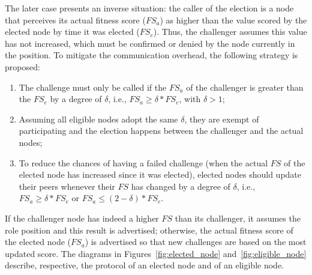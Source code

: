 The later case presents an inverse situation: the caller of the election is a node that perceives its actual fitness score ($FS_a$) as higher than the value scored by the elected node by time it was elected ($FS_e$). Thus, the challenger assumes this value has not increased, which must be confirmed or denied by the node currently in the position. To mitigate the communication overhead, the following strategy is proposed:

\begin{enumerate}

\item The challenge must only be called if the $FS_a$ of the challenger is greater than the $FS_e$ by a degree of $\delta$, i.e., $FS_a \ge \delta * FS_e$, with $\delta > 1$;

\item Assuming all eligible nodes adopt the same $\delta$, they are exempt of participating and the election happens between the challenger and the actual nodes;

\item To reduce the chances of having a failed challenge (when the actual $FS$ of the elected node has increased since it was elected), elected nodes should update their peers whenever their $FS$ has changed by a degree of $\delta$, i.e., $FS_a \ge \delta * FS_e$ or $FS_a \le (2 - \delta) * FS_e$.

\end{enumerate}

If the challenger node has indeed a higher $FS$ than its challenger, it assumes the role position and this result is advertised; otherwise, the actual fitness score of the elected node ($FS_a$) is advertised so that new challenges are based on the most updated score. The diagrams in Figures~\ref{fig:elected_node} and~\ref{fig:eligible_node} describe, respective, the protocol of an elected node and of an eligible node.
